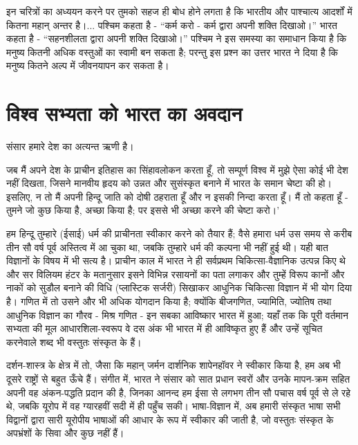 इन चरित्रों का अध्ययन करने पर तुमको सहज ही बोध होने लगता है कि भारतीय और पाश्चात्य आदर्शों में कितना महान् अन्तर है।... पश्चिम कहता है - “कर्म करो - कर्म द्वारा अपनी शक्ति दिखाओ।” भारत कहता है - “सहनशीलता द्वारा अपनी शक्ति दिखाओ।” पश्चिम ने इस समस्या का समाधान किया है कि मनुष्य कितनी अधिक वस्तुओं का स्वामी बन सकता है; परन्तु इस प्रश्न का उत्तर भारत ने दिया है कि मनुष्य कितने अल्प में जीवनयापन कर सकता है।


\section*{विश्व सभ्यता को भारत का अवदान}


संसार हमारे देश का अत्यन्त ऋणी है। 

जब मैं अपने देश के प्राचीन इतिहास का सिंहावलोकन करता हूँ, तो सम्पूर्ण विश्व में मुझे ऐसा कोई भी देश नहीं दिखता, जिसने मानवीय हृदय को उन्नत और सुसंस्कृत बनाने में भारत के समान चेष्टा की हो। इसलिए, न तो मैं अपनी हिन्दू जाति को दोषी ठहराता हूँ और न इसकी निन्दा करता हूँ। मैं तो कहता हूँ - तुमने जो कुछ किया है, अच्छा किया है; पर इससे भी अच्छा करने की चेष्टा करो।’ 

हम हिन्दू तुम्हारे (ईसाई) धर्म की प्राचीनता स्वीकार करने को तैयार हैं; वैसे हमारा धर्म उस समय से करीब तीन सौ वर्ष पूर्व अस्तित्व में आ चुका था, जबकि तुम्हारे धर्म की कल्पना भी नहीं हुई थी। यही बात विज्ञानों के विषय में भी सत्य है। प्राचीन काल में भारत ने ही सर्वप्रथम चिकित्सा-वैज्ञानिक उत्पन्न किए थे और सर विलियम हंटर के मतानुसार इसने विभिन्न रसायनों का पता लगाकर और तुम्हें विरूप कानों और नाकों को सुडौल बनाने की विधि (प्लास्टिक सर्जरी) सिखाकर आधुनिक चिकित्सा विज्ञान में भी योग दिया है। गणित में तो उसने और भी अधिक योगदान किया है; क्योंकि बीजगणित, ज्यामिति, ज्योतिष तथा आधुनिक विज्ञान का गौरव - मिश्र गणित - इन सबका आविष्कार भारत में हुआ; यहाँ तक कि पूरी वर्तमान सभ्यता की मूल आधारशिला-स्वरूप वे दस अंक भी भारत में ही आविष्कृत हुए हैं और उन्हें सूचित करनेवाले शब्द भी वस्तुतः संस्कृत के हैं। 

दर्शन-शास्त्र के क्षेत्र में तो, जैसा कि महान् जर्मन दार्शनिक शापेनहॉवर ने स्वीकार किया है, हम अब भी दूसरे राष्ट्रों से बहुत ऊँचे हैं। संगीत में, भारत ने संसार को सात प्रधान स्वरों और उनके मापन-क्रम सहित अपनी वह अंकन-पद्धति प्रदान की है, जिनका आनन्द हम ईसा से लगभग तीन सौ पचास वर्ष पूर्व से ले रहे थे, जबकि यूरोप में वह ग्यारहवीं सदी में ही पहुँच सकी। भाषा-विज्ञान में, अब हमारी संस्कृत भाषा सभी विद्वानों द्वारा सारी यूरोपीय भाषाओं की आधार के रूप में स्वीकार की जाती है, जो वस्तुतः संस्कृत के अपभ्रंशों के सिवा और कुछ नहीं हैं। 

